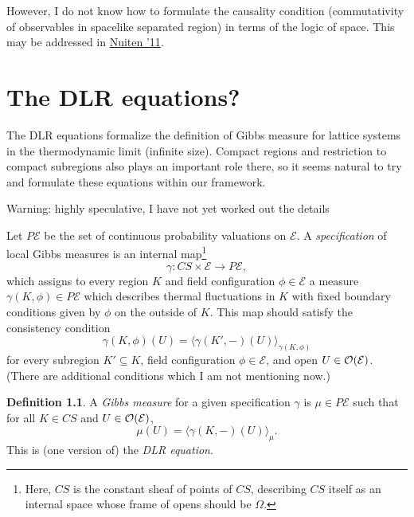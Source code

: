\documentclass[11pt, oneside, article]{memoir}
\theoremstyle{plain}
\theoremstyle{definition}
\newtheorem{definition}[theorem]{Definition}
\theoremstyle{remark}
\begin{document}
However, I do not know how to formulate the causality condition (commutativity of observables in spacelike separated region) in terms of the logic of space. This may be addressed in \href{https://arxiv.org/abs/1109.1397}{Nuiten '11}.


\chapter{The DLR equations?}

\printbibliography


The DLR equations formalize the definition of Gibbs measure for lattice systems in the thermodynamic limit (infinite size). Compact regions and restriction to compact subregions also plays an important role there, so it seems natural to try and formulate these equations within our framework.

Warning: highly speculative, I have not yet worked out the details

Let $P\mathcal{E}$ be the set of continuous probability valuations on $\mathcal{E}$. A \emph{specification} of local Gibbs measures is an internal map\footnote{Here, $CS$ is the constant sheaf of points of $CS$, describing $CS$ itself as an internal space whose frame of opens should be $\Omega$.}
\[
	\gamma : CS \times \mathcal{E} \to P\mathcal{E},
\]
which assigns to every region $K$ and field configuration $\phi\in\mathcal{E}$ a measure $\gamma(K,\phi)\in P\mathcal{E}$ which describes thermal fluctuations in $K$ with fixed boundary conditions given by $\phi$ on the outside of $K$. This map should satisfy the consistency condition
\[
	\gamma(K,\phi)(U) = \langle \gamma(K',-) (U) \rangle_{\gamma(K,\phi)}
\]
for every subregion $K'\subseteq K$, field configuration $\phi\in\mathcal{E}$, and open $U\in\mathcal{O}(\mathcal{E})$. (There are additional conditions which I am not mentioning now.)

\begin{definition}
A \emph{Gibbs measure} for a given specification $\gamma$ is $\mu\in P\mathcal{E}$ such that for all $K\in CS$ and $U \in \mathcal{O}(\mathcal{E})$,
\[
	\mu(U) = \langle \gamma(K,-)(U) \rangle_\mu.
\]
This is (one version of) the \emph{DLR equation}.
\end{definition}
\end{document}
